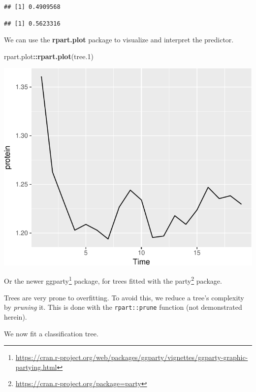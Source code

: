 \documentclass[]{book}
\newenvironment{Shaded}{\begin{snugshade}}{\end{snugshade}}
\newcommand{\CommentTok}[1]{\textcolor[rgb]{0.56,0.35,0.01}{\textit{#1}}}
\newcommand{\DataTypeTok}[1]{\textcolor[rgb]{0.13,0.29,0.53}{#1}}
\newcommand{\FloatTok}[1]{\textcolor[rgb]{0.00,0.00,0.81}{#1}}
\newcommand{\KeywordTok}[1]{\textcolor[rgb]{0.13,0.29,0.53}{\textbf{#1}}}
\newcommand{\NormalTok}[1]{#1}
\newcommand{\OperatorTok}[1]{\textcolor[rgb]{0.81,0.36,0.00}{\textbf{#1}}}
\newcommand{\StringTok}[1]{\textcolor[rgb]{0.31,0.60,0.02}{#1}}
\renewcommand{\href}[2]{#2\footnote{\url{#1}}}
\theoremstyle{definition}
\theoremstyle{definition}
\theoremstyle{definition}
\theoremstyle{remark}
\begin{document}
\begin{verbatim}
## [1] 0.4909568
\end{verbatim}

\begin{Shaded}
\end{Shaded}

\begin{verbatim}
## [1] 0.5623316
\end{verbatim}

We can use the \textbf{rpart.plot} package to visualize and interpret the predictor.

\begin{Shaded}
\begin{Highlighting}[]
\NormalTok{rpart.plot}\OperatorTok{::}\KeywordTok{rpart.plot}\NormalTok{(tree}\FloatTok{.1}\NormalTok{)}
\end{Highlighting}
\end{Shaded}

\includegraphics[width=0.5\linewidth]{Rcourse_files/figure-latex/unnamed-chunk-244-1}

Or the newer \href{https://cran.r-project.org/web/packages/ggparty/vignettes/ggparty-graphic-partying.html}{ggparty} package, for trees fitted with the \href{https://cran.r-project.org/package=party}{party} package.

Trees are very prone to overfitting.
To avoid this, we reduce a tree's complexity by \emph{pruning} it.
This is done with the \texttt{rpart::prune} function (not demonstrated herein).

We now fit a classification tree.
\end{document}
